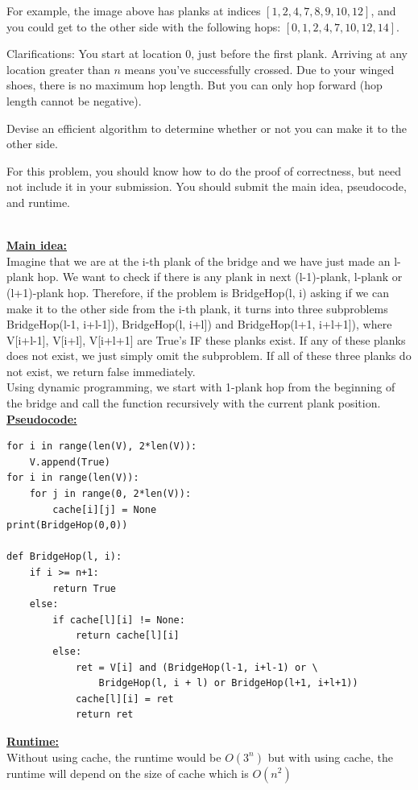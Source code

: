 \documentclass{article}\usepackage[utf8]{inputenc}\usepackage[margin=0.4cm,top=0.4cm,bottom=0.4cm]{geometry}
\begin{document}
\vspace{2pt}
\noindent For example, the image above has planks at indices $[1, 2, 4, 7, 8, 9, 10, 12]$, and you could get to the other
side with the following hops: $[0, 1, 2, 4, 7, 10, 12, 14]$.

\vspace{2pt}
\noindent Clarifications: You start at location 0, just before the first plank. Arriving at any location greater than $n$
means you've successfully crossed. Due to your winged shoes, there is no maximum hop length. But you can only hop forward (hop length cannot be negative).

\vspace{2pt}
\noindent Devise an efficient algorithm to determine whether or not you can make it to the other side.

\vspace{2pt}
\noindent For this problem, you should know how to do the proof of correctness, but need not include it in your
submission. You should submit the main idea, pseudocode, and runtime.

\BeginSolution %
\\
\underline{\textbf{Main idea:}}\\
Imagine that we are at the i-th plank of the bridge and we have just made an l-plank hop. We want to check if there is any plank in next (l-1)-plank, l-plank or (l+1)-plank hop. Therefore, if the problem is BridgeHop(l, i) asking if we can make it to the other side from the i-th plank, it turns into three subproblems BridgeHop(l-1, i+l-1]), BridgeHop(l, i+l]) and BridgeHop(l+1, i+l+1]), where V[i+l-1], V[i+l], V[i+l+1] are True's IF these planks exist. If any of these planks does not exist, we just simply omit the subproblem. If all of these three planks do not exist, we return false immediately.\\
Using dynamic programming, we start with 1-plank hop from the beginning of the bridge and call the function recursively with the current plank position.\\
\underline{\textbf{Pseudocode:}}\\
%
\begin{lstlisting}
for i in range(len(V), 2*len(V)):
	V.append(True)
for i in range(len(V)):
	for j in range(0, 2*len(V)):
		cache[i][j] = None
print(BridgeHop(0,0))

def BridgeHop(l, i):
	if i >= n+1:
		return True
	else:
		if cache[l][i] != None:
			return cache[l][i]
		else:
			ret = V[i] and (BridgeHop(l-1, i+l-1) or \
				BridgeHop(l, i + l) or BridgeHop(l+1, i+l+1))
			cache[l][i] = ret
			return ret
\end{lstlisting}
%
\underline{\textbf{Runtime:}}\\
Without using cache, the runtime would be $O(3^n)$ but with using cache, the runtime will depend on the size of cache which is $O(n^2)$
\EndSolution
\end{document}

